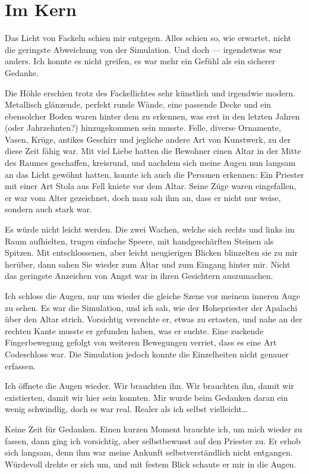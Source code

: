 \chapter{Im Kern}
\label{cha:im-kern}
Das Licht von Fackeln schien mir entgegen. Alles schien so, wie erwartet, nicht die geringste Abweichung von der Simulation. Und doch --- irgendetwas war anders. Ich konnte es nicht greifen, es war mehr ein Gefühl als ein sicherer Gedanke.

Die Höhle erschien trotz des Fackellichtes sehr künstlich und irgendwie modern. Metallisch glänzende, perfekt runde Wände, eine passende Decke und ein ebensolcher Boden waren hinter dem zu erkennen, was erst in den letzten Jahren (oder Jahrzehnten?) hinzugekommen sein musste. Felle, diverse Ornamente, Vasen, Krüge, antikes Geschirr und jegliche andere Art von Kunstwerk, zu der diese Zeit fähig war. Mit viel Liebe hatten die Bewohner einen Altar in der Mitte des Raumes geschaffen, kreisrund, und nachdem sich meine Augen nun langsam an das Licht gewöhnt hatten, konnte ich auch die Personen erkennen: Ein Priester mit einer Art Stola aus Fell kniete vor dem Altar. Seine Züge waren eingefallen, er war vom Alter gezeichnet, doch man sah ihm an, dass er nicht nur weise, sondern auch stark war. 

Es würde nicht leicht werden.
Die zwei Wachen, welche sich rechts und links im Raum aufhielten, trugen einfache Speere, mit handgeschärften Steinen als Spitzen. Mit entschlossenen, aber leicht neugierigen Blicken blinzelten sie zu mir herüber, dann sahen Sie wieder zum Altar und zum Eingang hinter mir. Nicht das geringste Anzeichen von Angst war in ihren Gesichtern auszumachen.

Ich schloss die Augen, nur um wieder die gleiche Szene vor meinem inneren Auge zu sehen. Es war die Simulation, und ich sah, wie der Hohepriester der Apalachi über den Altar strich. Vorsichtig versuchte er, etwas zu ertasten, und nahe an der rechten Kante musste er gefunden haben, was er suchte. Eine zuckende Fingerbewegung gefolgt von weiteren Bewegungen verriet, dass es eine Art Codeschloss war. Die Simulation jedoch konnte die Einzelheiten nicht genauer erfassen.

Ich öffnete die Augen wieder. Wir brauchten ihn. Wir brauchten ihn, damit wir existierten, damit wir hier sein konnten. Mir wurde beim Gedanken daran ein wenig schwindlig, doch es war real. Realer als ich selbst vielleicht\dots{}

Keine Zeit für Gedanken. Einen kurzen Moment brauchte ich, um mich wieder zu fassen, dann ging ich vorsichtig, aber selbstbewusst auf den Priester zu. Er erhob sich langsam, denn ihm war meine Ankunft selbstverständlich nicht entgangen. Würdevoll drehte er sich um, und mit festem Blick schaute er mir in die Augen.

